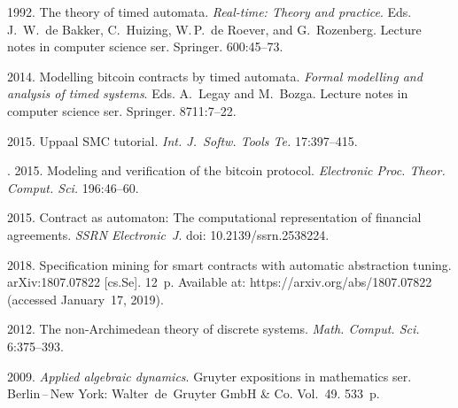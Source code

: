   \begin{multicols}{2}

\renewcommand{\bibname}{\protect\rmfamily References}

{\small\frenchspacing
 {%
 \begin{thebibliography}{99}
 1992.
The theory of timed automata.
\textit{Real-time: Theory and practice}.
Eds. J.~W.~de Bakker, C.~Huizing, W.\,P.~de Roever, 
 and G.~Rozenberg. Lecture notes
in  computer science ser.  Springer. 600:45--73.


 2014.
Modelling bitcoin contracts by timed automata.
\textit{Formal modelling and analysis of timed systems}.
Eds. A.~Legay and M.~Bozga. 
Lecture notes in computer science ser. Springer. 8711:7--22.


2015.
Uppaal SMC tutorial.
\textit{Int. J.~Softw. Tools Te.} 17:397--415.

. 2015.
Modeling and verification of the bitcoin protocol.
\textit{Electronic Proc. Theor. Comput. Sci.} 196:46--60.
  
 2015.
 Contract as automaton: The computational representation of financial
  agreements.
\textit{SSRN Electronic~J}.
doi: 10.2139/\linebreak ssrn.2538224.
  
2018.
 Specification mining for smart contracts with automatic abstraction
  tuning.  arXiv:1807.07822 [cs.Se]. 12~p.
Available at: {\sf https://arxiv.org/abs/1807.07822} (accessed
  January~17, 2019).
  
 2012.
The non-{A}rchimedean theory of discrete systems.
\textit{Math. Comput. Sci.} 6:375--393.




  2009.
\textit{Applied algebraic dynamics}.   Gruyter
  expositions in mathematics ser.
Berlin\,--\,New York: Walter~de~Gruyter GmbH \& Co. Vol.~49. 533~p.


\end{thebibliography}}}
\end{multicols}
